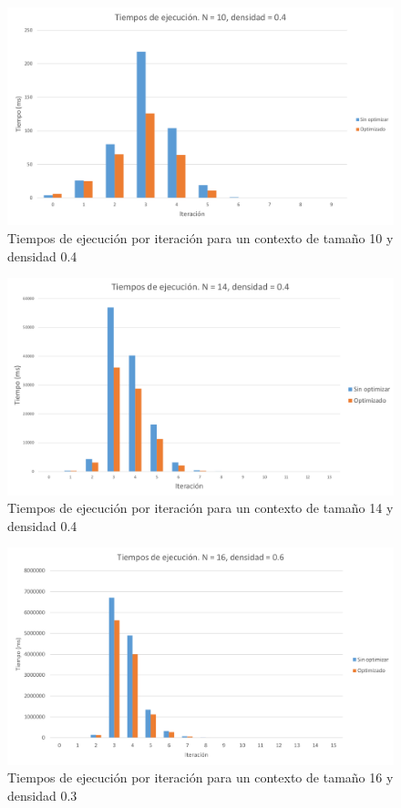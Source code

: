 	\begin{figure}[h]
		\centering
		\includegraphics[width=1\linewidth]{05_Pruebas/graficas/10_4}
		\caption{Tiempos de ejecución por iteración para un contexto de tamaño 10 y densidad 0.4}
		\label{fig:10_4}
	\end{figure}

	\begin{figure}[h]
		\centering
		\includegraphics[width=1\linewidth]{05_Pruebas/graficas/14_4}
		\caption{Tiempos de ejecución por iteración para un contexto de tamaño 14 y densidad 0.4}
		\label{fig:14_4}
	\end{figure}
	
	\begin{figure}[h]
		\centering
		\includegraphics[width=1\linewidth]{05_Pruebas/graficas/16_3}
		\caption{Tiempos de ejecución por iteración para un contexto de tamaño 16 y densidad 0.3}
		\label{fig:16_3}
	\end{figure}
	
